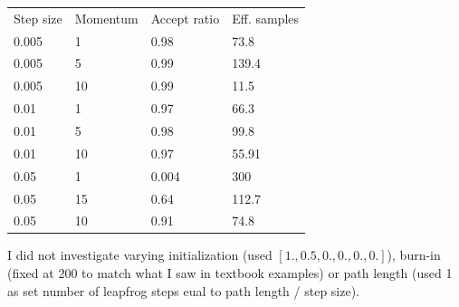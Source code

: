 \documentclass[12pt,letterpaper,twoside]{article}
\begin{document}
\begin{table}[H]
    \begin{tabular}{llll}
        Step size    & Momentum     & Accept ratio      & Eff. samples          \\
        0.005        & 1            & 0.98              & 73.8                  \\ 
        0.005        & 5            & 0.99              & 139.4                 \\
        0.005        & 10           & 0.99              & 11.5                  \\
        0.01         & 1            & 0.97              & 66.3                  \\
        0.01         & 5            & 0.98              & 99.8                  \\
        0.01         & 10           & 0.97              & 55.91                 \\
        0.05         & 1            & 0.004             & 300                   \\
        0.05         & 15           & 0.64              & 112.7                 \\
        0.05         & 10           & 0.91              & 74.8                  \\      
    \end{tabular}
\end{table}

I did not investigate varying initialization (used $[1., 0.5, 0., 0., 0., 0.]$), 
burn-in (fixed at 200 to match what I saw in textbook examples) or path length
(used 1 as set number of leapfrog steps eual to path length / step size).
\end{document}
